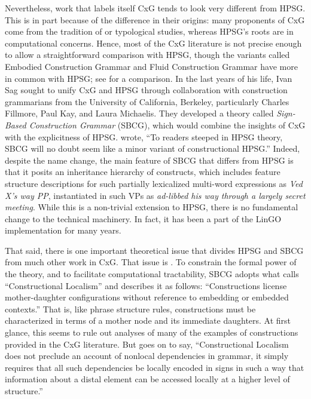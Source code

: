 \documentclass[output=paper
 	        ,biblatex
                ,babelshorthands
                ,newtxmath
                ,draftmode
                ,colorlinks, citecolor=brown
]{langscibook}
\begin{document}
Nevertheless,\label{page-sbcg-start} work that labels itself CxG tends to look very different from HPSG.  This is in part because of the difference in their origins: many proponents of CxG come from the tradition of  or typological studies, whereas HPSG's roots are in computational concerns. Hence, most of the CxG literature is not precise enough to allow a straightforward comparison with HPSG, though the variants called Embodied Construction Grammar and Fluid Construction Grammar have more in common with HPSG; see \cites{MuellerFCG}[Sections~10.6.3--10.6.4]{MuellerGT-Eng4} for a comparison.  In the last years of his life, Ivan Sag sought to unify CxG and HPSG through collaboration with construction grammarians from the University of California, Berkeley, particularly Charles Fillmore, Paul Kay, and Laura Michaelis.  They developed a theory called \emph{Sign-Based Construction Grammar} (SBCG), which would combine the insights of CxG with the explicitness of HPSG.  \citet[]{Sag2012a} wrote, ``To readers steeped in HPSG theory, SBCG will no doubt seem like a minor variant of constructional HPSG.''  Indeed, despite the name change, the main feature of SBCG that differs from HPSG is that it posits an inheritance hierarchy of constructs, which includes feature structure descriptions for such partially lexicalized multi-word expressions as \emph{Ved X's way PP}, instantiated in such VPs as \textit{ad-libbed his way through a largely secret meeting}.  While\label{evolution:page-sbcg-vs-lingo} this is a non-trivial extension to HPSG, there is no fundamental change to the technical machinery.  In fact, it has been a part of the LinGO implementation for many years.

That said, there is one important theoretical issue that divides HPSG and SBCG from much other work in CxG.  That issue is .  To constrain the formal power of the theory, and to facilitate computational tractability, SBCG adopts what \citet[]{Sag2012a} calls ``Constructional Localism'' and describes it as follows:  ``Constructions license mother-daughter configurations without reference to embedding or embedded contexts.''  That is, like phrase structure rules, constructions must be characterized in terms of a mother node and its immediate daughters.  At first glance, this seems to rule out analyses of many of the examples of constructions provided in the CxG literature.  But  \citet[]{Sag2012a} goes on to say, ``Constructional Localism does not preclude an account of nonlocal dependencies in grammar, it simply requires that all such dependencies be locally encoded in signs in such a way that information about a distal element can be accessed locally at a higher level of structure.''
\end{document}
